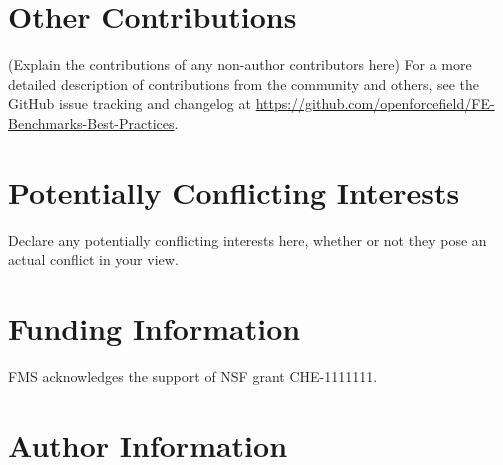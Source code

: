 \documentclass[9pt,bestpractices]{livecoms}
\newcommand{\githubrepository}{\url{https://github.com/openforcefield/FE-Benchmarks-Best-Practices}}  %
\begin{document}
\section{Other Contributions}
%

(Explain the contributions of any non-author contributors here)
For a more detailed description of contributions from the community and others, see the GitHub issue tracking and changelog at \githubrepository.

\section{Potentially Conflicting Interests}

Declare any potentially conflicting interests here, whether or not they pose an actual conflict in your view.

\section{Funding Information}
FMS acknowledges the support of NSF grant CHE-1111111.

\section*{Author Information}
\makeorcid




\end{document}
